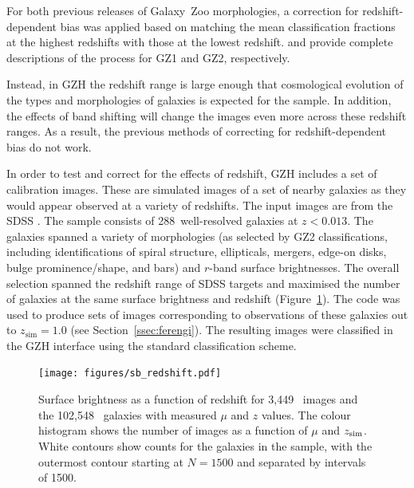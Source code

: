\documentclass[a4paper,fleqn,usenatbib]{mnras}
\begin{document}
For both previous releases of Galaxy~Zoo morphologies, a correction for
redshift-dependent bias was applied based on matching the mean classification
fractions at the highest redshifts with those at the lowest redshift.
\citet{bam09} and \citet{wil13} provide complete descriptions of the process
for GZ1 and GZ2, respectively.

Instead, in GZH the redshift range is large enough that cosmological evolution of the
types and morphologies of galaxies is expected for the \hst{} sample. In
addition, the effects of band shifting will change the images even more across
these redshift ranges. As a result, the previous methods of correcting for
redshift-dependent bias do not work.  

In order to test and correct for the effects of redshift, GZH includes a set of
calibration images.  These are simulated images of a set of nearby galaxies as
they would appear observed at a variety of redshifts.  The input images are
from the SDSS \citep{yor00,str02}.  The sample consists of 288~well-resolved galaxies
at $z<0.013$. The galaxies spanned a variety of morphologies (as selected by
GZ2 classifications, including identifications of spiral structure,
ellipticals, mergers, edge-on disks, bulge prominence/shape, and bars) and
$r$-band surface brightnesses.  The overall selection spanned the
redshift range of SDSS targets and maximised the number of \hst{} galaxies at
the same surface brightness and redshift (Figure~\ref{fig:sb_redshift}).  The
\ferengi{} code was used to produce sets of images corresponding to
observations of these galaxies out to $z_\mathrm{sim}=1.0$ (see
Section~\ref{ssec:ferengi}).  The resulting images were classified in the GZH
interface using the standard classification scheme.


\begin{figure}
\begin{center}
\texttt{[image: figures/sb\_redshift.pdf]}
\caption{Surface brightness as a function of redshift for 3,449~\ferengi{}
images and the 102,548~\main{} galaxies with measured $\mu$ and $z$ values. The
colour histogram shows the number of \ferengi{} images as a function of $\mu$
and $z_{\rm sim}$. White contours show counts for the galaxies in the \main{}
sample, with the outermost contour starting at $N=1500$ and separated by
intervals of 1500.} 
\label{fig:sb_redshift}
\end{center}
\end{figure}
\end{document}
